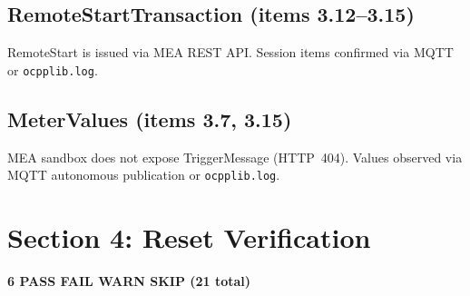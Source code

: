 \documentclass[10pt, a4paper]{article}
\begin{document}
\subsection*{RemoteStartTransaction (items 3.12--3.15)}
RemoteStart is issued via MEA REST API. Session items confirmed via MQTT or \texttt{ocpplib.log}.

\subsection*{MeterValues (items 3.7, 3.15)}
MEA sandbox does not expose TriggerMessage (HTTP~404).
Values observed via MQTT autonomous publication or \texttt{ocpplib.log}.



\newpage
\section{Section 4: Reset Verification}
\textbf{6 PASS  FAIL  WARN  SKIP \quad (21 total)}
\end{document}
